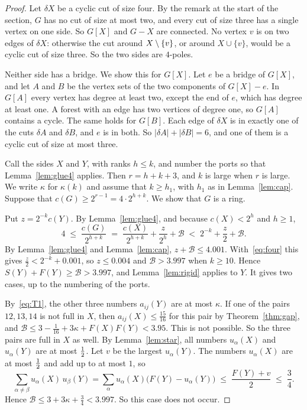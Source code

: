 \begin{proof}
Let $\delta X$ be a cyclic cut of size four. By the remark at the start of the section, $G$ has no
cut of size at most two, and every cut of size three has a single vertex on one side. So $G[X]$
and $G-X$ are connected. No vertex $v$ is on two edges of $\delta X$: otherwise the cut around
$X\setminus\{v\}$, or around $X\cup\{v\}$, would be a cyclic cut of size three. So the two sides are
$4$-poles.

Neither side has a bridge. We show this for $G[X]$. Let $e$ be a bridge of $G[X]$, and let $A$ and
$B$ be the vertex sets of the two components of $G[X]-e$. In $G[A]$ every vertex has degree at
least two, except the end of $e$, which has degree at least one. A forest with an edge has two
vertices of degree one, so $G[A]$ contains a cycle. The same holds for $G[B]$. Each edge of $\delta
X$ is in exactly one of the cuts $\delta A$ and $\delta B$, and $e$ is in both. So $|\delta
A|+|\delta B|=6$, and one of them is a cyclic cut of size at most three.

Call the sides $X$ and $Y$, with ranks $h\le k$, and number the ports so that
Lemma~\ref{lem:glue4} applies. Then $r=h+k+3$, and $k$ is large when $r$ is large. We write
$\kappa$ for $\kappa(k)$ and assume that $k\ge h_1$, with $h_1$ as in Lemma~\ref{lem:cap}. Suppose
that $c(G)\ge2^{r-1}=4\cdot2^{h+k}$. We show that $G$ is a ring.

 Put $z=2^{-k}c(Y)$. By Lemma~\ref{lem:glue4}, and because $c(X)<2^{h}$
and $h\ge1$,
\begin{equation}\label{eq:four}
  4\;\le\;\frac{c(G)}{2^{h+k}}\;=\;\frac{c(X)}{2^{h+k}}+\frac{z}{2^{h}}+\mathcal B
  \;<\;2^{-k}+\frac z2+\mathcal B .
\end{equation}
By Lemma~\ref{lem:glue4} and Lemma~\ref{lem:cap}, $z+\mathcal B\le4.001$. With~\eqref{eq:four}
this gives $\frac z2<2^{-k}+0.001$, so $z\le0.004$ and $\mathcal B>3.997$ when $k\ge10$. Hence
$S(Y)+F(Y)\ge\mathcal B>3.997$, and Lemma~\ref{lem:rigid} applies to $Y$. It gives two cases, up
to the numbering of the ports.

 By~\eqref{eq:T1}, the other three numbers
$a_{ij}(Y)$ are at most $\kappa$. If one of the pairs $12,13,14$ is not full in $X$, then
$a_{ij}(X)\le\frac{15}{16}$ for this pair by Theorem~\ref{thm:gap}, and
$\mathcal B\le3-\frac1{16}+3\kappa+F(X)F(Y)<3.95$. This is not possible. So the three pairs are
full in $X$ as well. By Lemma~\ref{lem:star}, all numbers $u_\alpha(X)$ and $u_\alpha(Y)$ are at
most $\tfrac12$. Let $v$ be the largest $u_\alpha(Y)$. The numbers $u_\alpha(X)$ are at most $\tfrac12$
and add up to at most $1$, so
\[
  \sum_{\alpha\ne\beta}u_\alpha(X)\,u_\beta(Y)=\sum_\alpha u_\alpha(X)\bigl(F(Y)-u_\alpha(Y)\bigr)
  \;\le\;\frac{F(Y)+v}2\;\le\;\frac34 .
\]
Hence $\mathcal B\le3+3\kappa+\frac34<3.997$. So this case does not occur.


\end{proof}
